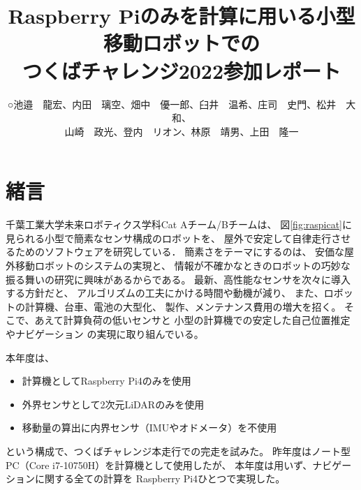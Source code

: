 \documentclass[twocolumn,9pt]{jsproceedings}
\title{Raspberry Piのみを計算に用いる小型移動ロボットでの\\つくばチャレンジ2022参加レポート}
\author{○池邉　龍宏\authorrefmark{1}、内田　璃空\authorrefmark{1}、畑中　優一郎\authorrefmark{1}、臼井　温希\authorrefmark{1}、庄司　史門\authorrefmark{1}、松井　大和\authorrefmark{1}、\\
山崎　政光\authorrefmark{1}、登内　リオン\authorrefmark{1}、林原　靖男\authorrefmark{1}、上田　隆一\authorrefmark{1}}
\affiliation{千葉工業大学 未来ロボティクス学科 Cat Aチーム/Bチーム}
\begin{document}
\maketitle



\section{緒言}

千葉工業大学未来ロボティクス学科Cat Aチーム/Bチームは、
図\ref{fig:raspicat}に見られる小型で簡素なセンサ構成のロボットを、
屋外で安定して自律走行させるためのソフトウェアを研究している．
簡素さをテーマにするのは、
安価な屋外移動ロボットのシステムの実現と、
情報が不確かなときのロボットの巧妙な振る舞いの研究に興味があるからである。
最新、高性能なセンサを次々に導入する方針だと、
アルゴリズムの工夫にかける時間や動機が減り、
また、ロボットの計算機、台車、電池の大型化、
製作、メンテナンス費用の増大を招く。
そこで、あえて計算負荷の低いセンサと
小型の計算機での安定した自己位置推定やナビゲーション
の実現に取り組んでいる。


本年度は、
\begin{itemize}
\item 計算機としてRaspberry Pi4のみを使用
\item 外界センサとして2次元LiDARのみを使用
\item 移動量の算出に内界センサ（IMUやオドメータ）を不使用
\end{itemize}
という構成で、つくばチャレンジ本走行での完走を試みた。
昨年度はノート型PC（Core i7-10750H）を計算機として使用したが、
本年度は用いず、ナビゲーションに関する全ての計算を
Raspberry Pi4ひとつで実現した。
\end{document}
